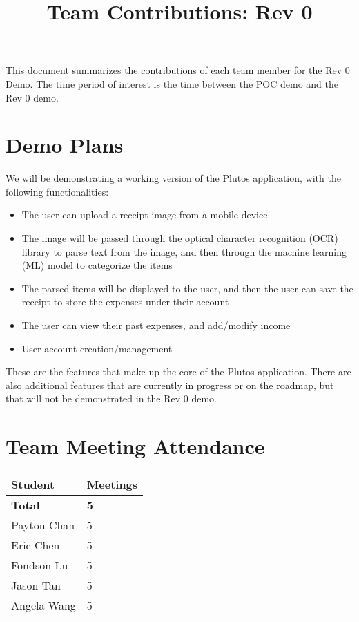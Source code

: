 \documentclass{article}
\title{Team Contributions: Rev 0\\\progname}
\author{\authname}
\date{}
\begin{document}
\maketitle

This document summarizes the contributions of each team member for the Rev 0
Demo.  The time period of interest is the time between the POC demo and the Rev
0 demo.

\section{Demo Plans}

We will be demonstrating a working version of the Plutos application, with the
following functionalities:
\begin{itemize}
    \item The user can upload a receipt image from a mobile device
    \item The image will be passed through the optical character recognition
    (OCR) library to parse text from the image, and then through the machine
    learning (ML) model to categorize the items
    \item The parsed items will be displayed to the user, and then the user can
    save the receipt to store the expenses under their account
    \item The user can view their past expenses, and add/modify income
    \item User account creation/management
\end{itemize}

\noindent These are the features that make up the core of the Plutos
application. There are also additional features that are currently in progress
or on the roadmap, but that will not be demonstrated in the Rev 0 demo.

\section{Team Meeting Attendance}


\begin{table}[H]
\centering
\begin{tabular}{ll}
\toprule
\textbf{Student} & \textbf{Meetings}\\
\midrule
\textbf{Total} & \textbf{5}\\
Payton Chan & 5\\
Eric Chen & 5\\
Fondson Lu & 5\\
Jason Tan & 5\\
Angela Wang & 5\\
\bottomrule
\end{tabular}
\end{table}
\end{document}
